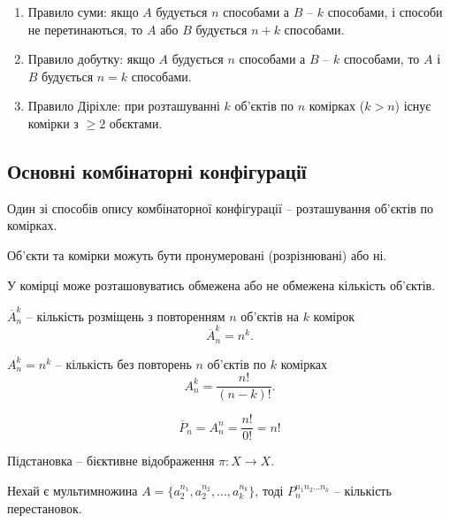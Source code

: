 \begin{claim}
    \begin{enumerate}
        \item Правило суми: якщо $A$ будується $n$ способами а $B$
            -- $k$ способами, і способи не перетинаються, то
            $A$ або $B$ будується $n+k$ способами.
        \item Правило добутку: якщо $A$ будується $n$ способами а $B$
            -- $k$ способами, то $A$ і $B$ будується $n=k$ способами.
        \item Правило Діріхле: при розташуванні $k$ об'єктів по $n$
            комірках ($k > n$) існує комірки з $\geqslant 2$ обєктами.
    \end{enumerate}
\end{claim}

\subsection{Основні комбінаторні конфігурації}

Один зі способів опису комбінаторної конфігурації
-- розташування об'єктів по комірках.

Об'єкти та комірки можуть бути пронумеровані
(розрізнювані) або ні.

У комірці може розташовуватись обмежена або
не обмежена кількість об'єктів.

\begin{definition}
    $\overline{A}_n^k$ -- кількість розміщень з повторенням $n$
    об'єктів на $k$ комірок
    $$\overline{A}_n^k = n^k.$$
\end{definition}

\begin{definition}
    $A_n^k = n^k$ -- кількість без повторень $n$ об'єктів
    по $k$ комірках
    $$A_n^k = \dfrac{n!}{(n-k)!}.$$
\end{definition}

\begin{definition}
    $$\overline{P}_n = A_n^n = \dfrac{n!}{0!} = n!$$
\end{definition}

\begin{definition}[Підстановка]
    Підстановка -- бієктивне відображення $\pi: X \rightarrow X$.
\end{definition}

\begin{definition}
    Нехай є мультимножина $A = \{ a_2^{n_1}, a_2^{n_2}, ..., a_k^{n_k} \}$,
    тоді $P_n^{n_1 n_2 ...n_k}$ -- кількість перестановок.
\end{definition}

